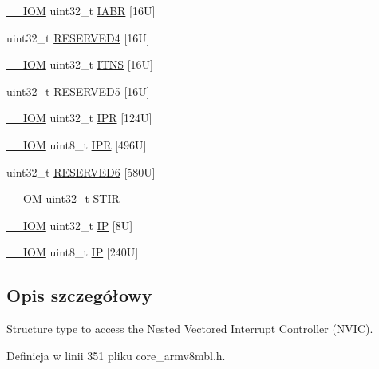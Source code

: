 \begin{DoxyCompactItemize}
\hyperlink{core__sc300_8h_ab6caba5853a60a17e8e04499b52bf691}{\+\_\+\+\_\+\+I\+OM} uint32\+\_\+t \hyperlink{struct_n_v_i_c___type_a6e42ca3d9a1e12e75463cef68785d533}{I\+A\+BR} \mbox{[}16\+U\mbox{]}
\item 
uint32\+\_\+t \hyperlink{struct_n_v_i_c___type_ab7e7cff95dfc1edc0c0dcce4e8345a6a}{R\+E\+S\+E\+R\+V\+E\+D4} \mbox{[}16\+U\mbox{]}
\item 
\hyperlink{core__sc300_8h_ab6caba5853a60a17e8e04499b52bf691}{\+\_\+\+\_\+\+I\+OM} uint32\+\_\+t \hyperlink{struct_n_v_i_c___type_a4940c96f11d1c95d95a28e388f04d6d6}{I\+T\+NS} \mbox{[}16\+U\mbox{]}
\item 
uint32\+\_\+t \hyperlink{struct_n_v_i_c___type_ae71fe7b11f01c3702aa6253b5309bbf9}{R\+E\+S\+E\+R\+V\+E\+D5} \mbox{[}16\+U\mbox{]}
\item 
\hyperlink{core__sc300_8h_ab6caba5853a60a17e8e04499b52bf691}{\+\_\+\+\_\+\+I\+OM} uint32\+\_\+t \hyperlink{struct_n_v_i_c___type_a71598b2d46c2fa6708a7908a1c63c43c}{I\+PR} \mbox{[}124\+U\mbox{]}
\item 
\hyperlink{core__sc300_8h_ab6caba5853a60a17e8e04499b52bf691}{\+\_\+\+\_\+\+I\+OM} uint8\+\_\+t \hyperlink{struct_n_v_i_c___type_adfd45d2d45654c4e775017800f33e9a3}{I\+PR} \mbox{[}496\+U\mbox{]}
\item 
uint32\+\_\+t \hyperlink{struct_n_v_i_c___type_ad91f19091b4eecbe7322cdb36fad41c8}{R\+E\+S\+E\+R\+V\+E\+D6} \mbox{[}580\+U\mbox{]}
\item 
\hyperlink{core__sc300_8h_a0ea2009ed8fd9ef35b48708280fdb758}{\+\_\+\+\_\+\+OM} uint32\+\_\+t \hyperlink{struct_n_v_i_c___type_a37de89637466e007171c6b135299bc75}{S\+T\+IR}
\item 
\hyperlink{core__sc300_8h_ab6caba5853a60a17e8e04499b52bf691}{\+\_\+\+\_\+\+I\+OM} uint32\+\_\+t \hyperlink{struct_n_v_i_c___type_a4eef47929a0d1317a107f1ac62e28464}{IP} \mbox{[}8\+U\mbox{]}
\item 
\hyperlink{core__sc300_8h_ab6caba5853a60a17e8e04499b52bf691}{\+\_\+\+\_\+\+I\+OM} uint8\+\_\+t \hyperlink{struct_n_v_i_c___type_a9a4341692e45d089a113986a3d344e98}{IP} \mbox{[}240\+U\mbox{]}
\end{DoxyCompactItemize}


\subsection{Opis szczegółowy}
Structure type to access the Nested Vectored Interrupt Controller (N\+V\+IC). 

Definicja w linii 351 pliku core\+\_\+armv8mbl.\+h.



